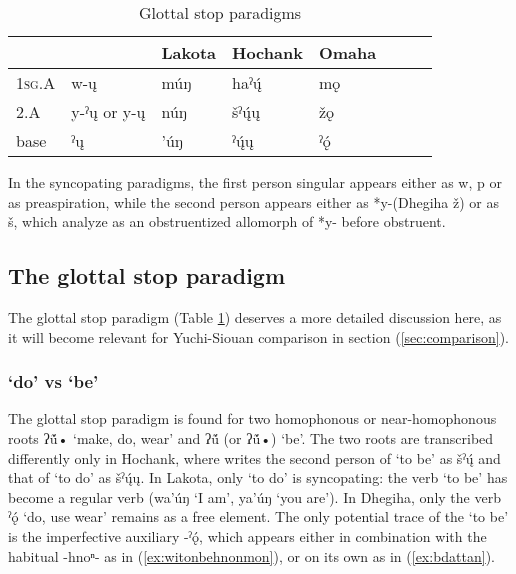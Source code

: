 \documentclass[oneside,a4paper,11pt]{article}
\newcommand{\ipa}[1]{{\phon#1}} %
\begin{document}
\begin{table}[H]
\caption{Glottal stop paradigms} \label{tab:glottal} \centering
\begin{tabular}{llllllll}
\toprule
 & 	 & 	Lakota & 	Hochank & 	Omaha & \\
 \midrule
\textsc{1sg.A} & 	\ipa{*w-ų}   & 	\ipa{múŋ} & 	\ipa{haˀų́} & 	\ipa{mǫ} & \\
2.A & 	\ipa{*y-ˀų} or 	\ipa{*y-ų}  & 	\ipa{núŋ} & 	\ipa{šˀų́ų} & 	\ipa{žǫ} &\\ 
base & 	\ipa{*ˀų} & 	\ipa{'úŋ} & 	\ipa{ˀų́ų} & 	\ipa{ˀǫ́} & \\
\bottomrule
\end{tabular}
\end{table}

In the syncopating paradigms, the first person singular appears either as \ipa{*w}, \ipa{*p} or as preaspiration, while the second person appears either as *\ipa{y-}(Dhegiha \ipa{ž}) or as \ipa{š}, which \citet{rankin15csd} analyze as an obstruentized allomorph of *\ipa{y-} before obstruent.

\subsection{The glottal stop paradigm} \label{sec:glottal}
The glottal stop paradigm (Table \ref{tab:glottal}) deserves a more detailed discussion here, as it will become relevant for Yuchi-Siouan comparison in section (\ref{sec:comparison}).


\subsubsection{`do' vs `be'}
The glottal stop paradigm is found for two homophonous or near-homophonous roots \ipa{*ʔṹ•}  `make, do, wear' and \ipa{*ʔṹ}  (or  \ipa{*ʔṹ•}) `be'. The two roots are transcribed differently only in Hochank, where \citet{helmbrecht06hocak} writes the second person of `to be' as \ipa{šˀų́} and that of `to do' as \ipa{šˀų́ų}. In Lakota, only `to do' is syncopating: the verb `to be' has become a regular verb (\ipa{wa'úŋ} `I am', \ipa{ya'úŋ} `you are'). In Dhegiha, only the verb \ipa{ˀǫ́} `do, use wear' remains as a free element. The only potential trace of the `to be' is the imperfective auxiliary \ipa{-ˀǫ́}, which appears either in combination with the habitual \ipa{-hnoⁿ-} as in (\ref{ex:witonbehnonmon}), or on its own as in (\ref{ex:bdattan}).
\end{document}
